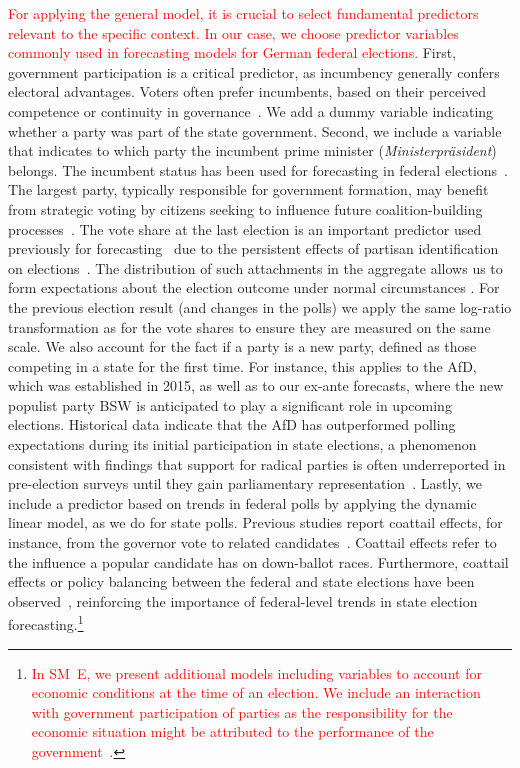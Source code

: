 \documentclass[doublespaced,12pt]{article}
\begin{document}
\begin{doublespacing}
\textcolor{red}{For applying the general model, it is crucial to select fundamental predictors relevant to the specific context. In our case, we choose predictor variables commonly used in forecasting models for German federal elections.}  First, government participation is a critical predictor, as incumbency generally confers electoral advantages. Voters often prefer incumbents, based on their perceived competence or continuity in governance~\citep{allers2022parties,eggers_incumbency_2017}.
We add a dummy variable indicating whether a party was part of the state government.  Second, we include a variable that indicates to which party the incumbent prime minister (\textit{Ministerpräsident}) belongs. The incumbent status has been used for forecasting in federal elections~\citep{munzert_2017}. The largest party, typically responsible for government formation, may benefit from strategic voting by citizens seeking to influence future coalition-building processes~\citep{cox1997making,Harsgor2023, Meffert2010}.
The vote share at the last election is an important predictor used previously for forecasting~\citep{munzert_2017, Stoetzer_Neunhoeffer_Gschwend_Munzert_Sternberg_2019} due to the persistent effects of partisan identification on elections~\citep{campbell_impact_1960}. The distribution of such attachments in the aggregate allows us to form expectations about the election outcome under normal circumstances \citep{Converse1966}. For the previous election result (and changes in the polls) we apply the same log-ratio transformation as for the vote shares to ensure they are measured on the same scale.
We also account for the fact if a party is a new party, defined as those competing in a state for the first time. For instance, this applies to the AfD, which was established in 2015, as well as to our ex-ante forecasts, where the new populist party BSW is anticipated to play a significant role in upcoming elections. Historical data indicate that the AfD has outperformed polling expectations during its initial participation in state elections, a phenomenon consistent with findings that support for radical parties is often underreported in pre-election surveys until they gain parliamentary representation~\citep{valentim_right_2021}.
Lastly, we include a predictor based on trends in federal polls by applying the dynamic linear model, as we do for state polls. Previous studies report coattail effects, for instance, from the governor vote to related candidates~\citep{MEREDITH_2013}. Coattail effects refer to the influence a popular candidate has on down-ballot races. Furthermore, coattail effects or policy balancing between the federal and state elections have been observed~\citep{BORGES2016104, Kedar2006a}, reinforcing the importance of federal-level trends in state election forecasting.\footnote{\textcolor{red}{In SM~E, we present additional models including variables to account for economic conditions at the time of an election. We include an interaction with government participation of parties as the responsibility for the economic situation might be attributed to the performance of the government~\citep{enns2024understanding, mongrain202110}.}}


\end{doublespacing}
\end{document}
